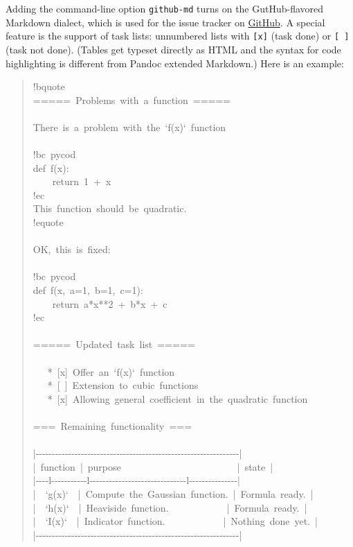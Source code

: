 \documentclass[a4paper]{article}
\begin{document}
Adding the command-line option \texttt{github-md} turns on the GutHub-flavored
Markdown dialect, which is used for the issue tracker on \href{http://github.com}{GitHub}. A special feature is the support of task lists:
unnumbered lists with \texttt{{[}x{]}} (task done) or \texttt{{[} {]}} (task not done).
(Tables get typeset directly as HTML and the syntax for code highlighting
is different from Pandoc extended Markdown.) Here is an example:
%
\begin{quote}{\ttfamily \raggedright \noindent
!bquote\\
=====~Problems~with~a~function~=====\\
~\\
There~is~a~problem~with~the~`f(x)`~function\\
~\\
!bc~pycod\\
def~f(x):\\
~~~~return~1~+~x\\
!ec\\
This~function~should~be~quadratic.\\
!equote\\
~\\
OK,~this~is~fixed:\\
~\\
!bc~pycod\\
def~f(x,~a=1,~b=1,~c=1):\\
~~~~return~a*x**2~+~b*x~+~c\\
!ec\\
~\\
=====~Updated~task~list~=====\\
~\\
~~~*~{[}x{]}~Offer~an~`f(x)`~function\\
~~~*~{[}~{]}~Extension~to~cubic~functions\\
~~~*~{[}x{]}~Allowing~general~coefficient~in~the~quadratic~function\\
~\\
===~Remaining~functionality~===\\
~\\
|-{}-{}-{}-{}-{}-{}-{}-{}-{}-{}-{}-{}-{}-{}-{}-{}-{}-{}-{}-{}-{}-{}-{}-{}-{}-{}-{}-{}-{}-{}-{}-{}-{}-{}-{}-{}-{}-{}-{}-{}-{}-{}-{}-{}-{}-{}-{}-{}-{}-{}-{}-{}-{}-{}-{}-{}-{}-{}-{}-{}-{}-{}-|\\
|~function~|~purpose~~~~~~~~~~~~~~~~~~~~~~~~|~state~|\\
|-{}-{}-{}-l-{}-{}-{}-{}-{}-{}-{}-{}-{}-{}-l-{}-{}-{}-{}-{}-{}-{}-{}-{}-{}-{}-{}-{}-{}-{}-{}-{}-{}-{}-{}-{}-{}-{}-{}-{}-{}-{}-{}-{}-l-{}-{}-{}-{}-{}-{}-{}-{}-{}-{}-{}-{}-{}-{}-|\\
|~~`g(x)`~~|~Compute~the~Gaussian~function.~|~Formula~ready.~|\\
|~~`h(x)`~~|~Heaviside~function.~~~~~~~~~~~~|~Formula~ready.~|\\
|~~`I(x)`~~|~Indicator~function.~~~~~~~~~~~~|~Nothing~done~yet.~|\\
|-{}-{}-{}-{}-{}-{}-{}-{}-{}-{}-{}-{}-{}-{}-{}-{}-{}-{}-{}-{}-{}-{}-{}-{}-{}-{}-{}-{}-{}-{}-{}-{}-{}-{}-{}-{}-{}-{}-{}-{}-{}-{}-{}-{}-{}-{}-{}-{}-{}-{}-{}-{}-{}-{}-{}-{}-{}-{}-{}-{}-{}-{}-|
}
\end{quote}
\end{document}
